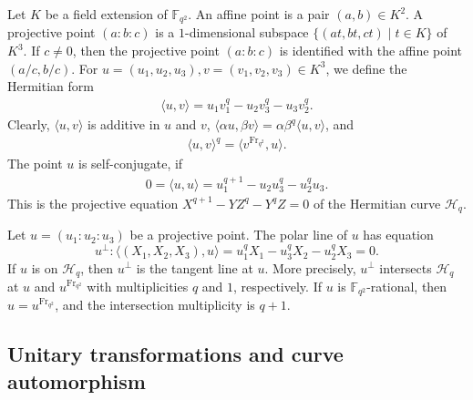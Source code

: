 \documentclass[entropy,article,submit,pdftex,moreauthors]{Definitions/mdpi}
\newcommand{\Frob}{{\mathrm{Fr}_{q^2}}}
\begin{document}
Let $K$ be a field extension of $\mathbb{F}_{q^2}$. An affine point is a pair $(a,b)\in K^2$. A projective point $(a:b:c)$ is a $1$-dimensional subspace $\{(at,bt,ct) \mid t\in K\}$ of $K^3$. If $c\neq 0$, then the projective point $(a:b:c)$ is identified with the affine point $(a/c,b/c)$. For $u=(u_1,u_2,u_3), v=(v_1,v_2,v_3) \in K^3$, we define the Hermitian form 
\begin{align*} %
\langle u,v \rangle = u_1v_1^q-u_2v_3^q-u_3v_2^q.
\end{align*}
Clearly, $\langle u,v \rangle$ is additive in $u$ and $v$, $\langle \alpha u, \beta v\rangle =\alpha \beta^q \langle u,v \rangle$, and 
\begin{align*} %
\langle u,v \rangle^q=\langle v^\Frob,u \rangle.
\end{align*}
The point $u$ is self-conjugate, if 
\begin{align*} %
0=\langle u,u \rangle = u_1^{q+1}-u_2u_3^q-u_2^qu_3.
\end{align*}
This is the projective equation $X^{q+1}-YZ^q-Y^qZ=0$ of the Hermitian curve $\mathscr{H}_q$. 

Let $u=(u_1:u_2:u_3)$ be a projective point. The polar line of $u$ has equation
\[u^\perp: \langle (X_1,X_2,X_3), u \rangle = u_1^qX_1-u_3^qX_2-u_2^qX_3=0.\]
If $u$ is on $\mathscr{H}_q$, then $u^\perp$ is the tangent line at $u$. More precisely, $u^\perp$ intersects $\mathscr{H}_q$ at $u$ and $u^\Frob$ with multiplicities $q$ and $1$, respectively. If $u$ is $\mathbb{F}_{q^2}$-rational, then $u=u^\Frob$, and the intersection multiplicity is $q+1$. 

\subsection{Unitary transformations and curve automorphism} \label{ssec:unitary}
\end{document}
